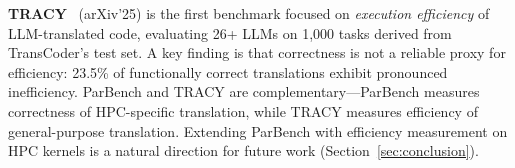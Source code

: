 \documentclass{article}
\begin{document}
\textbf{TRACY}~\cite{TRACY2025} (arXiv'25) is the first benchmark focused on \emph{execution efficiency} of LLM-translated code, evaluating 26+ LLMs on 1,000 tasks derived from TransCoder's test set. A key finding is that correctness is not a reliable proxy for efficiency: 23.5\% of functionally correct translations exhibit pronounced inefficiency. ParBench and TRACY are complementary---ParBench measures correctness of HPC-specific translation, while TRACY measures efficiency of general-purpose translation. Extending ParBench with efficiency measurement on HPC kernels is a natural direction for future work (Section~\ref{sec:conclusion}).




\end{document}
